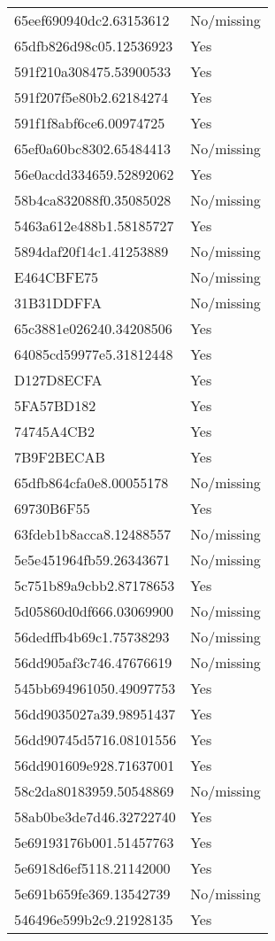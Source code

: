 \begin{tabular}{ll}
65eef690940dc2.63153612 & No/missing \\
65dfb826d98c05.12536923 & Yes \\
591f210a308475.53900533 & Yes \\
591f207f5e80b2.62184274 & Yes \\
591f1f8abf6ce6.00974725 & Yes \\
65ef0a60bc8302.65484413 & No/missing \\
56e0acdd334659.52892062 & Yes \\
58b4ca832088f0.35085028 & No/missing \\
5463a612e488b1.58185727 & Yes \\
5894daf20f14c1.41253889 & No/missing \\
E464CBFE75 & No/missing \\
31B31DDFFA & No/missing \\
65c3881e026240.34208506 & Yes \\
64085cd59977e5.31812448 & Yes \\
D127D8ECFA & Yes \\
5FA57BD182 & Yes \\
74745A4CB2 & Yes \\
7B9F2BECAB & Yes \\
65dfb864cfa0e8.00055178 & No/missing \\
69730B6F55 & Yes \\
63fdeb1b8acca8.12488557 & No/missing \\
5e5e451964fb59.26343671 & No/missing \\
5c751b89a9cbb2.87178653 & Yes \\
5d05860d0df666.03069900 & No/missing \\
56dedffb4b69c1.75738293 & No/missing \\
56dd905af3c746.47676619 & No/missing \\
545bb694961050.49097753 & Yes \\
56dd9035027a39.98951437 & Yes \\
56dd90745d5716.08101556 & Yes \\
56dd901609e928.71637001 & Yes \\
58c2da80183959.50548869 & No/missing \\
58ab0be3de7d46.32722740 & Yes \\
5e69193176b001.51457763 & Yes \\
5e6918d6ef5118.21142000 & Yes \\
5e691b659fe369.13542739 & No/missing \\
546496e599b2c9.21928135 & Yes \\

\end{tabular}
